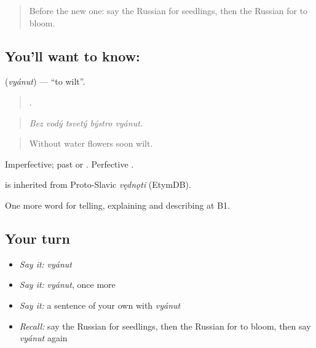 \label{lesson:RU-C507-vyanut}



\begin{quote}
Before the new one: say the Russian for seedlings, then the Russian for to bloom.
\end{quote}

\subsection*{You'll want to know: }
\textbf{} (\emph{vyánut}) — \textquotedblleft{}to wilt\textquotedblright{}.

\begin{quote}
    .
\end{quote}

\begin{quote}
\emph{Bez vodý tsvetý býstro vyánut.}
\end{quote}

\begin{quote}
Without water flowers soon wilt.
\end{quote}

Imperfective; past  or . Perfective .

\begin{cousinweb}
\emph{} is inherited from Proto-Slavic \emph{vędnǫti} (EtymDB).
\end{cousinweb}

\begin{grammarlens}[title={What you've built}]
One more word for telling, explaining and describing at B1.
\end{grammarlens}

\subsection*{Your turn}
\begin{itemize}
\raggedright
  \item \emph{Say it:} \emph{vyánut}
  \item \emph{Say it:} \emph{vyánut}, once more
  \item \emph{Say it:} a sentence of your own with \emph{vyánut}
  \item \emph{Recall:} say the Russian for seedlings, then the Russian for to bloom, then say \emph{vyánut} again
\end{itemize}

